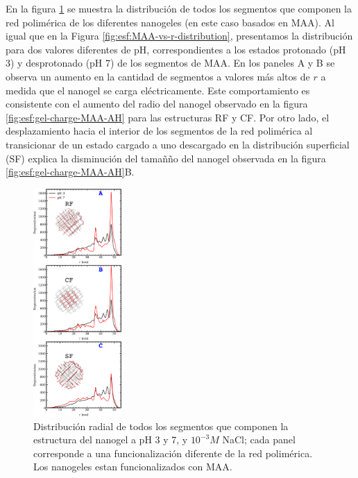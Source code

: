 En la figura \ref{fig:esf:allr-distribution} se muestra la distribuci\'on de todos los segmentos que componen la red polim\'erica de los diferentes nanogeles (en este caso basados en MAA). Al igual que en la Figura \ref{fig:esf:MAA-vs-r-distribution}, presentamos la distribuci\'on para dos valores diferentes de pH, correspondientes a los estados protonado (pH 3) y desprotonado (pH 7) de los segmentos de MAA. En los paneles A y B se observa un aumento en la cantidad de segmentos a valores m\'as altos de $r$ a medida que el nanogel se carga el\'ectricamente. Este comportamiento es consistente con el aumento del radio del nanogel observado en la figura \ref{fig:esf:gel-charge-MAA-AH} para las estructuras RF y CF. Por otro lado, el desplazamiento hacia el interior de los segmentos de la red polim\'erica al transicionar de un estado cargado a uno descargado en la distribuci\'on superficial (SF) explica la disminuci\'on del tamañ\~no del nanogel observada en la figura \ref{fig:esf:gel-charge-MAA-AH}B.

\begin{figure}[!htb]
	\centering
	\includegraphics[width=0.30\textwidth]{Figures/graphs-gel2/allseg_SI.pdf}
	\caption{Distribuci\'on radial de todos los segmentos que componen la estructura del nanogel a pH 3 y 7, y $10^{-3}M$ NaCl; cada panel corresponde a una funcionalizaci\'on  diferente de la red polim\'erica. Los nanogeles estan funcionalizados con MAA.}
	\label{fig:esf:allr-distribution}
\end{figure}




